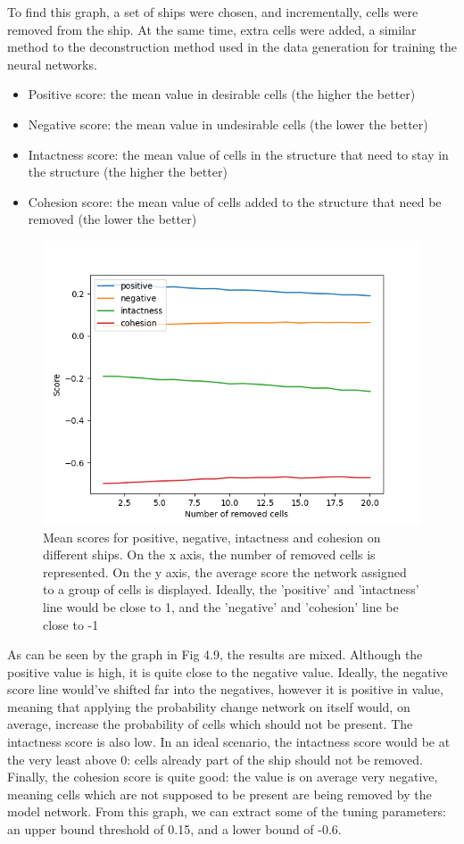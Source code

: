 \documentclass{l4proj}
\begin{document}
To find this graph, a set of ships were chosen, and incrementally, cells were removed from the ship. At the same time, extra cells were added, a similar method to the deconstruction method used in the data generation for training the neural networks.

\begin{itemize}
    \item Positive score: the mean value in desirable cells (the higher the better)
    \item Negative score: the mean value in undesirable cells (the lower the better)
    \item Intactness score: the mean value of cells in the structure that need to stay in the structure (the higher the better)
    \item Cohesion score: the mean value of cells added to the structure that need be removed (the lower the better)
\end{itemize}

\begin{figure}[h!]
\centering
\includegraphics[width=0.8\linewidth]{dissertation/images/graphs/n_removed_cells_score_probability_analysis.png}
\caption{Mean scores for positive, negative, intactness and cohesion on different ships. On the x axis, the number of removed cells is represented. On the y axis, the average score the network assigned to a group of cells is displayed. Ideally, the 'positive' and 'intactness' line would be close to 1, and the 'negative' and 'cohesion' line be close to -1}
\label{fig:subim1}
\end{figure}

As can be seen by the graph in Fig 4.9, the results are mixed. Although the positive value is high, it is quite close to the negative value. Ideally, the negative score line would've shifted far into the negatives, however it is positive in value, meaning that applying the probability change network on itself would, on average, increase the probability of cells which should not be present. The intactness score is also low. In an ideal scenario, the intactness score would be at the very least above 0: cells already part of the ship should not be removed. Finally, the cohesion score is quite good: the value is on average very negative, meaning cells which are not supposed to be present are being removed by the model network. From this graph, we can extract some of the tuning parameters: an upper bound threshold of 0.15, and a lower bound of -0.6.
\end{document}
